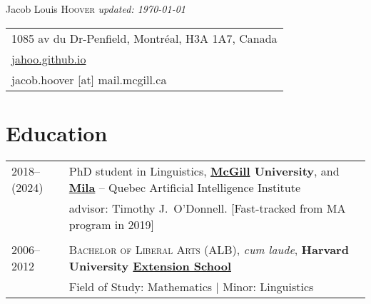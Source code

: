 \documentclass[11pt,a4paper]{article}
\begin{document}
\pagestyle{empty}
\Huge{Jacob Louis \scshape{Hoover}}
\small\textit{\hfill updated: \today}

\begin{tabular}{p{\textwidth}}
  1085 av du Dr-Penfield, Montréal, H3A 1A7, Canada\\
  \href{http://jahoo.github.io}{jahoo.github.io}\\
  jacob.hoover [at] mail.mcgill.ca\\
\end{tabular}

\vspace*{10pt}

\section{Education}

\begin{longtable}{p{1.7cm}|p{15cm}}
  2018--(2024)%
    &%
    PhD student in Linguistics,
    \textbf{\href{https://www.mcgill.ca/linguistics/graduate}{McGill} University}, and
    \href{http://mila.quebec}{\textbf{Mila}} -- Quebec Artificial Intelligence
    Institute\\
    &%
    advisor: Timothy J.\ O'Donnell. [Fast-tracked from MA program in 2019]\\
    \multicolumn{2}{c}{}\\
  2006--2012%
    &%
    \textsc{Bachelor of Liberal Arts (ALB)}, \emph{cum laude},
    \textbf{Harvard University \href{https://extension.harvard.edu/}{Extension School}}\\
    &%
    Field of Study: Mathematics | Minor: Linguistics\\
  \end{longtable}
\end{document}
